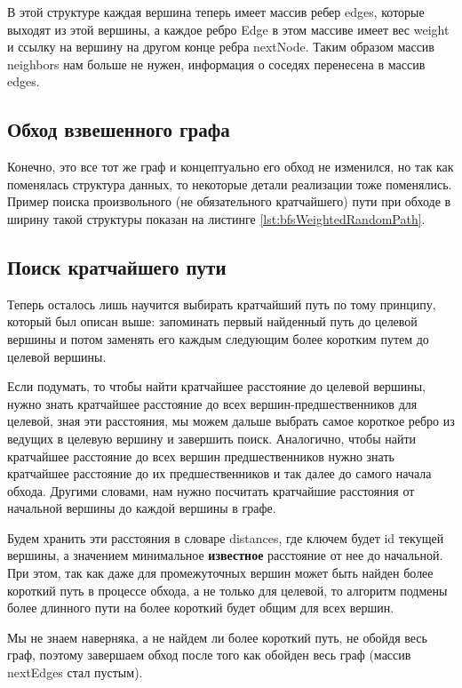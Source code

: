 \documentclass[../article.tex]{subfiles}
\begin{document}
В этой структуре каждая вершина теперь имеет массив ребер {\firacodebold edges}, которые выходят из этой вершины, а каждое ребро {\firacodebold Edge} в этом массиве имеет вес {\firacodebold weight} и ссылку на вершину на другом конце ребра {\firacodebold nextNode}. Таким образом массив {\firacodebold neighbors} нам больше не нужен, информация о соседях перенесена в массив {\firacodebold edges}.

\subsection{Обход взвешенного графа}

Конечно, это все тот же граф и концептуально его обход не изменился, но так как поменялась структура данных, то некоторые детали реализации тоже поменялись. Пример поиска произвольного (не обязательного кратчайшего) пути при обходе в ширину такой структуры показан на листинге \ref{lst:bfsWeightedRandomPath}.

\subsection{Поиск кратчайшего пути}

Теперь осталось лишь научится выбирать кратчайший путь по тому принципу, который был описан выше: запоминать первый найденный путь до целевой вершины и потом заменять его каждым следующим более коротким путем до целевой вершины.

Если подумать, то чтобы найти кратчайшее расстояние до целевой вершины, нужно знать кратчайшее расстояние до всех вершин-предшественников для целевой, зная эти расстояния, мы можем дальше выбрать самое короткое ребро из ведущих в целевую вершину и завершить поиск. Аналогично, чтобы найти кратчайшее расстояние до всех вершин предшественников нужно знать кратчайшее расстояние до их предшественников и так далее до самого начала обхода. Другими словами, нам нужно посчитать кратчайшие расстояния от начальной вершины до каждой вершины в графе.

Будем хранить эти расстояния в словаре {\firacodebold distances}, где ключем будет {\firacodebold id} текущей вершины, а значением минимальное {\bfseries известное} расстояние от нее до начальной. При этом, так как даже для промежуточных вершин может быть найден более короткий путь в процессе обхода, а не только для целевой, то алгоритм подмены более длинного пути на более короткий будет общим для всех вершин.

Мы не знаем наверняка, а не найдем ли более короткий путь, не обойдя весь граф, поэтому завершаем обход после того как обойден весь граф (массив {\firacodebold nextEdges} стал пустым).
\end{document}
